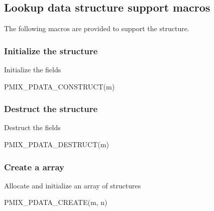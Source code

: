 \subsection{Lookup data structure support macros}

The following macros are provided to support the  structure.

\subsubsection{Initialize the  structure}

Initialize the  fields

\cspecificstart
\begin{codepar}
PMIX_PDATA_CONSTRUCT(m)
\end{codepar}
\cspecificend

\begin{arglist}
\end{arglist}

\subsubsection{Destruct the  structure}

Destruct the  fields

\cspecificstart
\begin{codepar}
PMIX_PDATA_DESTRUCT(m)
\end{codepar}
\cspecificend

\begin{arglist}
\end{arglist}

\subsubsection{Create a  array}

Allocate and initialize an array of  structures

\cspecificstart
\begin{codepar}
PMIX_PDATA_CREATE(m, n)
\end{codepar}
\cspecificend

